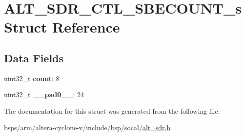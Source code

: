 \hypertarget{structALT__SDR__CTL__SBECOUNT__s}{}\section{A\+L\+T\+\_\+\+S\+D\+R\+\_\+\+C\+T\+L\+\_\+\+S\+B\+E\+C\+O\+U\+N\+T\+\_\+s Struct Reference}
\label{structALT__SDR__CTL__SBECOUNT__s}
\subsection*{Data Fields}
\begin{DoxyCompactItemize}
\item 
\mbox{\label{structALT__SDR__CTL__SBECOUNT__s_a3a70aabe2e4f70c463bc432caa2d9fc9}} 
uint32\+\_\+t {\bfseries count}\+: 8
\item 
\mbox{\label{structALT__SDR__CTL__SBECOUNT__s_a0fbedb20709afaaa7b066bdd152098d7}} 
uint32\+\_\+t {\bfseries \+\_\+\+\_\+pad0\+\_\+\+\_\+}\+: 24
\end{DoxyCompactItemize}


The documentation for this struct was generated from the following file\+:\begin{DoxyCompactItemize}
\item 
bsps/arm/altera-\/cyclone-\/v/include/bsp/socal/\mbox{\hyperlink{alt__sdr_8h}{alt\+\_\+sdr.\+h}}\end{DoxyCompactItemize}
